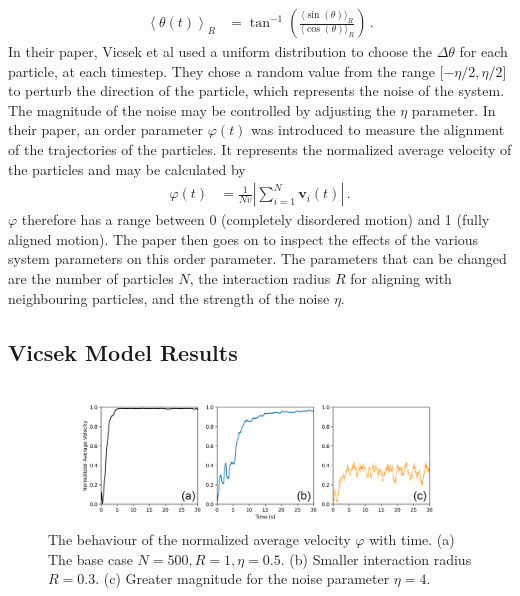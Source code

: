 \documentclass[%
11pt,
amsmath, amssymb,
aps,
pra
]{revtex4-2}
\begin{document}
\begin{align}
    \left\langle\theta(t)\right\rangle _R &= \tan ^{-1}\left(\frac{\langle \sin(\theta)\rangle _R}{\langle \cos(\theta)\rangle _R}\right) \,.
\end{align}
In their paper, Vicsek et al used a uniform distribution to choose the \(\Delta\theta\) for each particle, at each timestep.
They chose a random value from the range [\(-\eta/2, \eta/2\)] to perturb the direction of the particle, which represents the noise
of the system. The magnitude of the noise may be controlled by adjusting the \(\eta\) parameter. In their paper,
an order parameter \(\varphi(t)\) was introduced to measure the alignment of the trajectories of the particles. 
It represents the normalized average velocity of the particles and
may be 
calculated by
\begin{align}
    \varphi(t) &= \frac{1}{Nv}\left|\sum_{i=1}^{N}\mathbf{v}_i(t)\right|\,.
\end{align}
\(\varphi\) therefore has a range between 0 (completely disordered motion) and 1 (fully aligned motion).
The paper then goes on to inspect the effects of the various system parameters on this order parameter.
The parameters that can be changed are the number of particles \(N\), the interaction radius \(R\) for aligning with neighbouring
particles, and the strength of the noise \(\eta\). 

\subsection{Vicsek Model Results}

\begin{figure}[tb]
    \includegraphics[width=\textwidth]{figures/vicsek/averageVelocities.png}
    \caption{The behaviour of the normalized average velocity \(\varphi\) with time.
    (a) The base case \(N=500, R=1, \eta=0.5\).
    (b) Smaller interaction radius \(R=0.3\).
    (c) Greater magnitude for the noise parameter \(\eta=4\).
    }
    \label{fig:VicsekPhiTime}
\end{figure}
\end{document}
